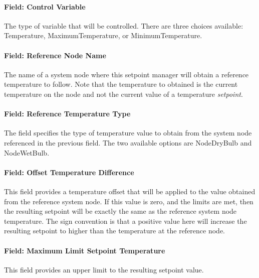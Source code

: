 \paragraph{Field: Control Variable}\label{field-control-variable-15}

The type of variable that will be controlled. There are three choices available: Temperature, MaximumTemperature, or MinimumTemperature.

\paragraph{Field: Reference Node Name}\label{field-reference-node-name}

The name of a system node where this setpoint manager will obtain a reference temperature to follow. Note that the temperature to obtained is the current temperature on the node and not the current value of a temperature \emph{setpoint}.

\paragraph{Field: Reference Temperature Type}\label{field-reference-temperature-type-1}

The field specifies the type of temperature value to obtain from the system node referenced in the previous field. The two available options are NodeDryBulb and NodeWetBulb.

\paragraph{Field: Offset Temperature Difference}\label{field-offset-temperature-difference-1}

This field provides a temperature offset that will be applied to the value obtained from the reference system node. If this value is zero, and the limits are met, then the resulting setpoint will be exactly the same as the reference system node temperature. The sign convention is that a positive value here will increase the resulting setpoint to higher than the temperature at the reference node.

\paragraph{Field: Maximum Limit Setpoint Temperature}\label{field-maximum-limit-setpoint-temperature}

This field provides an upper limit to the resulting setpoint value.

